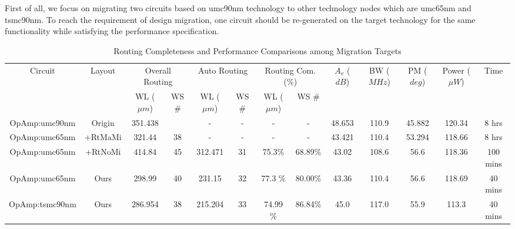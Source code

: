     First of all, we focus on migrating two circuits based on umc90nm technology to other technology nodes which are umc65nm and tsmc90nm. To reach the requirement of design migration, one circuit should be re-generated on the target technology for the same functionality while satisfying the performance specification. 

    
    
    \begin{table}[ht]
      \hspace{-1em}
      \begin{threeparttable}
      \scriptsize
      \begin{center}
        \caption{Routing Completeness and Performance Comparisons among Migration Targets}\label{table:MigrationPerf}
      \begin{tabular}{|c|c|c|c|c|c|c|c|c|c|c|c|c|}
        \toprule  
        \hline
          \multirow{2}{*}{Circuit}& 
          \multirow{2}{*}{Layout} & 
          \multicolumn{2}{c|}{Overall Routing \tnote{a}} & 
          \multicolumn{2}{c|}{Auto Routing \tnote{b}} & 
          \multicolumn{2}{c|}{Routing Com.\tnote{c} (\%)} & 
          \multirow{2}{1cm}{$A_v$ ($dB$)} & 
          \multirow{2}{1cm}{BW ($MHz$)} & 
          \multirow{2}{1cm}{PM ($deg$)} & 
          \multirow{2}{1cm}{Power ($\mu W$)}  &
          \multirow{2}{*}{Time }\\
          \cline{3-8} 
          & & WL ($\mu m$) & WS \# &  WL ($\mu m$) & WS \#  &  WL ($\mu m$) & WS \# & & & & & \\
        \hline
        OpAmp:umc90nm &  Origin & 351.438 & & - &-  &-& - & 48.653 &  110.9 & 45.882  & 120.34 &  8 hrs \\
        \hline
        OpAmp:umc65nm &  \cite{msc-bhattacharya-tcad06}+RtMaMi &  321.44 & 38 & - & - & - & - & 43.421& 110.4 &53.294 & 118.66 &  8 hrs \\
        \hline
        OpAmp:umc65nm & \cite{msc-bhattacharya-tcad06}+RtNoMi& 414.84 & 45 & 312.471 & 31 & 75.3\% & 68.89\%& 43.02& 108.6& 56.6& 118.36 &  100 mins \\
        \hline
        OpAmp:umc65nm &  Ours & 298.99& 40 & 231.15 &32 &  77.3 \%& 80.00\% & 43.36 & 110.4 & 56.6 & 118.69 & 40 mins \\
        \hline
        OpAmp:tsmc90nm  &  Ours & 286.954& 38 &  215.204& 33&  74.99 \% & 86.84\%& 45.0 &117.0 &55.9 & 113.3 & 40 mins \\

\end{tabular}
\end{center}
\end{threeparttable}
\end{table}
